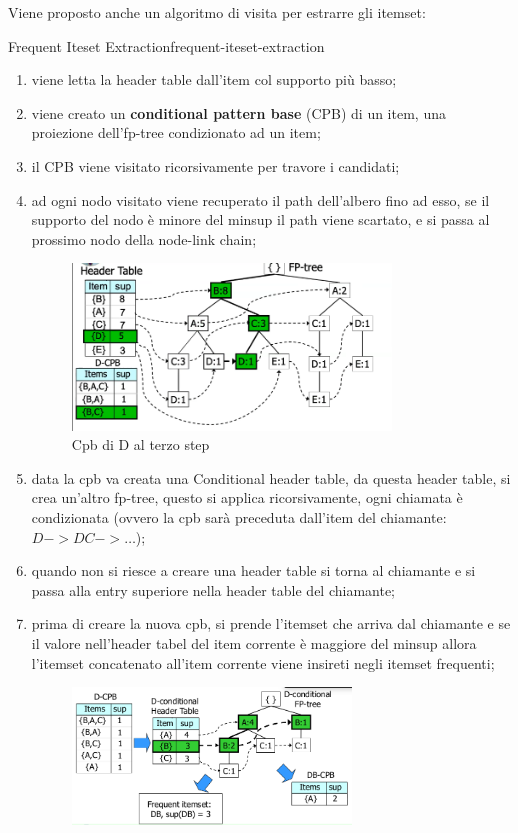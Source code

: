 \documentclass[12pt]{article}
\begin{document}
Viene proposto anche un algoritmo di visita per estrarre gli itemset:
\begin{definition}{Frequent Iteset Extraction}{frequent-iteset-extraction}
\begin{enumerate}
    \item viene letta la header table dall'item col supporto pi\`u basso;
    \item viene creato un \textbf{conditional pattern base} (CPB) di un item, una proiezione dell'fp-tree condizionato ad un item;
    \item il CPB viene visitato ricorsivamente per travore i candidati;
    \item ad ogni nodo visitato viene recuperato il path dell'albero fino ad esso, se il supporto del nodo \`e minore del minsup il path viene scartato, e si passa al prossimo nodo della node-link chain;
        \begin{figure}[H]
            \centering
            \includegraphics[width=0.8\textwidth]{cpd-di-d.png}
            \caption{Cpb di D al terzo step}
            \label{fig:cpb-di-d}
        \end{figure}
    \item data la cpb va creata una Conditional header table, da questa header table, si crea un'altro fp-tree, questo si applica ricorsivamente, ogni chiamata \`e condizionata (ovvero la cpb sar\`a preceduta dall'item del chiamante: $ D -> DC -> \dots$);
    \item quando non si riesce a creare una header table si torna al chiamante e si passa alla entry superiore nella header table del chiamante;
    \item prima di creare la nuova cpb, si prende l'itemset che arriva dal chiamante e se il valore nell'header tabel del item corrente \`e maggiore del minsup allora l'itemset concatenato all'item corrente viene insireti negli itemset frequenti;
        \begin{figure}[H]
            \centering
            \includegraphics[width=0.7\textwidth]{esempio-aggiunta-itemset-nei-valori-frequenti.png}

\end{figure}
\end{enumerate}
\end{definition}
\end{document}
